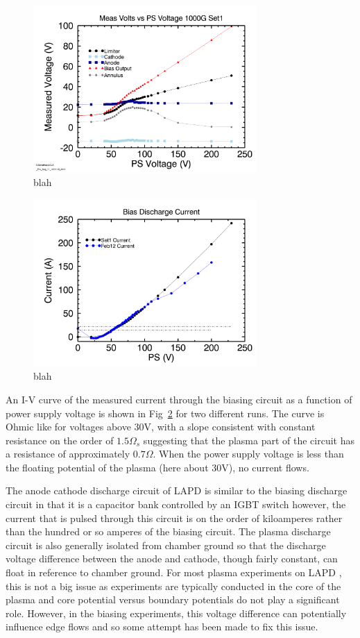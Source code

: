 \documentclass[aip,pop,amsmath,amssymb,preprint,superscriptaddress]{revtex4-1} %
\begin{document}
\begin{figure}[!htbp]
\centerline{
\includegraphics[width=8.5cm]{VbyBias}}
\caption{\label{fig:VbyBias} blah}
\end{figure}

\begin{figure}[!htbp]
\centerline{
\includegraphics[width=8.5cm]{IV_curves}}
\caption{\label{fig:IV_curves} blah}
\end{figure}

An I-V curve of the measured current through the biasing circuit as a function of power supply voltage is shown in Fig~\ref{fig:IV_curves} for two different runs. The curve is Ohmic like for voltages above 30V, with a slope consistent with constant resistance on the order of $1.5\Omega_{s}$ suggesting that the plasma part of the circuit has a resistance of approximately $0.7\Omega$. When the power supply voltage is less than the floating potential of the plasma (here about 30V), no current flows.

The anode cathode discharge circuit of LAPD is similar to the biasing discharge circuit in that it is a capacitor bank controlled by an IGBT switch however, the current that is pulsed through this circuit is on the order of kiloamperes rather than the hundred or so amperes of the biasing circuit. The plasma discharge circuit is also generally isolated from chamber ground so that the discharge voltage difference between the anode and cathode, though fairly constant, can float in reference to chamber ground. For most plasma experiments on LAPD , this is  not a big issue as experiments are typically conducted in the core of the plasma and core potential versus boundary potentials do not play a significant role. However, in the biasing experiments, this voltage difference can potentially influence edge flows and so some attempt has been made to fix this issue.
\end{document}
